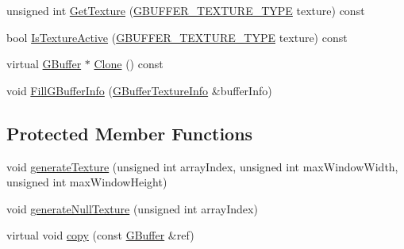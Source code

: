 \begin{DoxyCompactItemize}
\item 
unsigned int \mbox{\hyperlink{class_geometry_engine_1_1_geometry_buffer_1_1_g_buffer_a2ea57f74fe7c40ea19d120ee271daeca}{Get\+Texture}} (\mbox{\hyperlink{class_geometry_engine_1_1_geometry_buffer_1_1_g_buffer_a718dceafcac1915f7de061108597e1cc}{G\+B\+U\+F\+F\+E\+R\+\_\+\+T\+E\+X\+T\+U\+R\+E\+\_\+\+T\+Y\+PE}} texture) const
\item 
bool \mbox{\hyperlink{class_geometry_engine_1_1_geometry_buffer_1_1_g_buffer_a66ccde86e455532b2eac771163570f04}{Is\+Texture\+Active}} (\mbox{\hyperlink{class_geometry_engine_1_1_geometry_buffer_1_1_g_buffer_a718dceafcac1915f7de061108597e1cc}{G\+B\+U\+F\+F\+E\+R\+\_\+\+T\+E\+X\+T\+U\+R\+E\+\_\+\+T\+Y\+PE}} texture) const
\item 
virtual \mbox{\hyperlink{class_geometry_engine_1_1_geometry_buffer_1_1_g_buffer}{G\+Buffer}} $\ast$ \mbox{\hyperlink{class_geometry_engine_1_1_geometry_buffer_1_1_g_buffer_af993f8c23f7e78051f3071be4873af9d}{Clone}} () const
\item 
void \mbox{\hyperlink{class_geometry_engine_1_1_geometry_buffer_1_1_g_buffer_ad1242e69d277b69b58497f7d489e176c}{Fill\+G\+Buffer\+Info}} (\mbox{\hyperlink{struct_geometry_engine_1_1_g_buffer_texture_info}{G\+Buffer\+Texture\+Info}} \&buffer\+Info)
\end{DoxyCompactItemize}
\subsection*{Protected Member Functions}
\begin{DoxyCompactItemize}
\item 
void \mbox{\hyperlink{class_geometry_engine_1_1_geometry_buffer_1_1_g_buffer_a6194e72290d3fe4eafa565f57befabb2}{generate\+Texture}} (unsigned int array\+Index, unsigned int max\+Window\+Width, unsigned int max\+Window\+Height)
\item 
void \mbox{\hyperlink{class_geometry_engine_1_1_geometry_buffer_1_1_g_buffer_aac01b2527d2b501e1f923ae6558469e5}{generate\+Null\+Texture}} (unsigned int array\+Index)
\item 
virtual void \mbox{\hyperlink{class_geometry_engine_1_1_geometry_buffer_1_1_g_buffer_a9f20eb78703ef048d59a54f90ee09f25}{copy}} (const \mbox{\hyperlink{class_geometry_engine_1_1_geometry_buffer_1_1_g_buffer}{G\+Buffer}} \&ref)
\end{DoxyCompactItemize}
